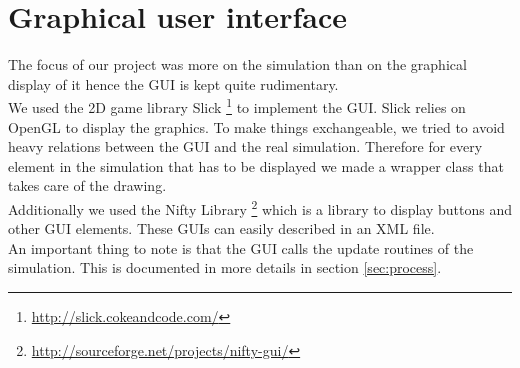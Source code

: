 
\section{Graphical user interface}
\label{sec:gui}

The focus of our project was more on the simulation than on the graphical 
display of it hence the GUI is kept quite rudimentary. \\

\noindent We used the 2D game library Slick 
\footnote{\href{http://slick.cokeandcode.com/}{http://slick.cokeandcode.com/}}
to implement the GUI. Slick relies on OpenGL to display the graphics.
To make things exchangeable, we tried to avoid heavy
relations between the GUI and the real simulation. Therefore for every 
element in the simulation that has to be displayed we made a wrapper class
that takes care of the drawing. \\

\noindent Additionally we used the Nifty Library 
\footnote{\href{http://sourceforge.net/projects/nifty-gui/}
{http://sourceforge.net/projects/nifty-gui/}} which is a library to display
buttons and other GUI elements. These GUIs can easily described in an XML file. \\

An important thing to note is that the GUI calls the update routines of the
simulation. This is documented in more details in section \ref{sec:process}.
